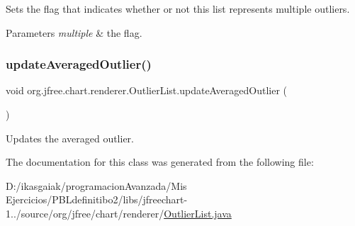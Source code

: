 Sets the flag that indicates whether or not this list represents multiple outliers.


\begin{DoxyParams}{Parameters}
{\em multiple} & the flag. \\
\hline
\end{DoxyParams}
\mbox{\label{classorg_1_1jfree_1_1chart_1_1renderer_1_1_outlier_list_ac3a51c9fbe1368fa86bd142349960c1c}} 
\subsubsection{\texorpdfstring{update\+Averaged\+Outlier()}{updateAveragedOutlier()}}
{\footnotesize\ttfamily void org.\+jfree.\+chart.\+renderer.\+Outlier\+List.\+update\+Averaged\+Outlier (\begin{DoxyParamCaption}{ }\end{DoxyParamCaption})}

Updates the averaged outlier. 

The documentation for this class was generated from the following file\+:\begin{DoxyCompactItemize}
\item 
D\+:/ikasgaiak/programacion\+Avanzada/\+Mis Ejercicios/\+P\+B\+Ldefinitibo2/libs/jfreechart-\/1../source/org/jfree/chart/renderer/\mbox{\hyperlink{_outlier_list_8java}{Outlier\+List.\+java}}\end{DoxyCompactItemize}
